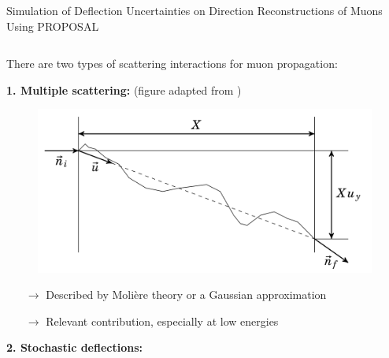 \documentclass[t]{beamer}
\begin{document}
  \begin{columns}[onlytextwidth]%
    \begin{column}{\textwidth}%
    \begin{block}[equal height group=J]{Simulation of Deflection Uncertainties on Direction Reconstructions of Muons Using PROPOSAL}%
      \begin{columns}[onlytextwidth]
        \begin{column}{0.33\textwidth}

        There are two types of scattering interactions for muon propagation:
      \vspace{0.5em}

        \textbf{1. Multiple scattering:} (figure adapted from \cite{dunsch})

        \begin{figure}
          \includegraphics[width=0.7\linewidth, height=.4\textheight, keepaspectratio]{plots/multiple_scattering_dunsch.png}
        \end{figure}

        \begin{itemize}
          \item[$\rightarrow$] Described by Molière theory or a Gaussian approximation
          \item[$\rightarrow$] Relevant contribution, especially at low energies
        \end{itemize}

      \vspace{0.5em}

        \textbf{2. Stochastic deflections:}

        \begin{figure}
\end{figure}
\end{column}
\end{columns}
\end{block}
\end{column}
\end{columns}
\end{document}
